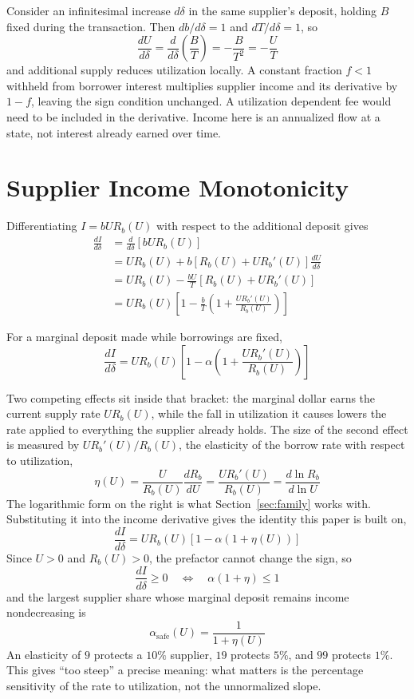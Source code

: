 \documentclass[11pt,a4paper]{article}
\begin{document}
Consider an infinitesimal increase $d\delta$ in the same supplier's deposit, holding $B$ fixed during the transaction. Then $db/d\delta=1$ and $dT/d\delta=1$, so
\[
\frac{dU}{d\delta}
=\frac{d}{d\delta}\left(\frac{B}{T}\right)
=-\frac{B}{T^2}
=-\frac{U}{T}
\]
and additional supply reduces utilization locally. A constant fraction $f<1$ withheld from borrower interest multiplies supplier income and its derivative by $1-f$, leaving the sign condition unchanged. A utilization dependent fee would need to be included in the derivative. Income here is an annualized flow at a state, not interest already earned over time.

\section{Supplier Income Monotonicity}
\label{sec:condition}

Differentiating $I=bUR_b(U)$ with respect to the additional deposit gives
\[
\begin{aligned}
\frac{dI}{d\delta}
&=\frac{d}{d\delta}\left[bUR_b(U)\right] \\
&=UR_b(U)+b\left[R_b(U)+UR_b'(U)\right]\frac{dU}{d\delta} \\
&=UR_b(U)-\frac{bU}{T}\left[R_b(U)+UR_b'(U)\right] \\
&=UR_b(U)\left[1-\frac{b}{T}\left(1+\frac{UR_b'(U)}{R_b(U)}\right)\right]
\end{aligned}
\]

\begin{proposition}
For a marginal deposit made while borrowings are fixed,
\[
\boxed{
\frac{dI}{d\delta}
=UR_b(U)\left[1-\alpha\left(1+\frac{UR_b'(U)}{R_b(U)}\right)\right]
}
\]
\end{proposition}

Two competing effects sit inside that bracket: the marginal dollar earns the current supply rate $UR_b(U)$, while the fall in utilization it causes lowers the rate applied to everything the supplier already holds. The size of the second effect is measured by $UR_b'(U)/R_b(U)$, the elasticity of the borrow rate with respect to utilization,
\[
\boxed{
\eta(U)=\frac{U}{R_b(U)}\frac{dR_b}{dU}
=\frac{UR_b'(U)}{R_b(U)}
=\frac{d\ln R_b}{d\ln U}
}
\]
The logarithmic form on the right is what Section~\ref{sec:family} works with. Substituting it into the income derivative gives the identity this paper is built on,
\[
\boxed{
\frac{dI}{d\delta}
=UR_b(U)\left[1-\alpha(1+\eta(U))\right]
}
\]
Since $U>0$ and $R_b(U)>0$, the prefactor cannot change the sign, so
\[
\frac{dI}{d\delta}\geq0
\quad\Longleftrightarrow\quad
\alpha(1+\eta)\leq1
\]
and the largest supplier share whose marginal deposit remains income nondecreasing is
\[
\boxed{
\alpha_{\mathrm{safe}}(U)=\frac{1}{1+\eta(U)}
}
\]
An elasticity of $9$ protects a $10\%$ supplier, $19$ protects $5\%$, and $99$ protects $1\%$. This gives ``too steep'' a precise meaning: what matters is the percentage sensitivity of the rate to utilization, not the unnormalized slope.
\end{document}
